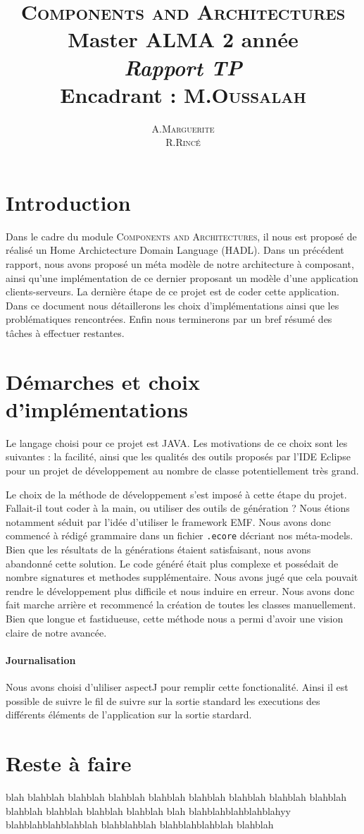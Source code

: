 \documentclass[12pt]{article}
\title{ {\huge \textsc{Components and Architectures}} \\  Master ALMA 2\up{eme} année  \\ \emph{Rapport TP}\\{\small Encadrant :  M.\textsc{Oussalah}}}
\author{A.\textsc{Marguerite} \\ R.\textsc{Rincé}}
\begin{document}
\maketitle
\renewcommand{\labelitemi}{$\bullet$} 



\section{Introduction}\label{sec:intro}
Dans le cadre du module \textsc{Components and Architectures}, il nous est proposé de réalisé un Home Archictecture Domain Language (HADL). Dans un précédent rapport, nous avons proposé un méta modèle de notre architecture à composant, ainsi qu'une implémentation de ce dernier proposant un modèle d'une application clients-serveurs. La dernière étape de ce projet est de coder cette application. Dans ce document nous détaillerons les choix d'implémentations ainsi que les problématiques rencontrées. Enfin nous terminerons par un bref résumé des tâches à effectuer restantes.
\section{Démarches et choix d'implémentations}\label{sec:pblm}
Le langage choisi pour ce projet est JAVA. Les motivations de ce choix sont les suivantes : la facilité, ainsi que les qualités des outils proposés par l'IDE Eclipse pour un projet de développement au nombre de classe potentiellement très grand. 

Le choix de la méthode de développement s'est imposé à cette étape du projet. Fallait-il tout coder à la main, ou utiliser des outils de génération ? Nous étions notamment séduit par l'idée d'utiliser le framework EMF. Nous avons donc commencé à rédigé grammaire dans un fichier \verb+.ecore+ décriant nos méta-models. Bien que les résultats de la générations étaient satisfaisant, nous avons abandonné cette solution. Le code généré était plus complexe et possédait de nombre signatures et methodes supplémentaire. Nous avons jugé que cela pouvait rendre le développement plus difficile et nous induire en erreur. Nous avons donc fait marche arrière et recommencé la création de toutes les classes manuellement. Bien que longue et fastidueuse, cette méthode nous a permi d'avoir une vision claire de notre avancée.

\paragraph{Journalisation}
Nous avons choisi d'uliliser aspectJ pour remplir cette fonctionalité.  Ainsi il est possible de suivre le fil de suivre sur la sortie standard les executions des différents éléments de l'application sur la sortie stardard. 

\section{Reste à faire}
blah blahblah blahblah blahblah blahblah blahblah blahblah blahblah blahblah blahblah blahblah blahblah blahblah blah
blahblahblahblahblahyy blahblahblahblahblah blahblahblah blahblahblahblah blahblah
\end{document}
